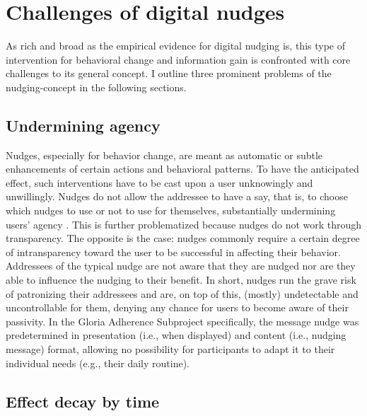 \documentclass[reflection, authordate]{jote-new-article}
\begin{document}
\section{Challenges of digital nudges}



As rich and broad as the empirical evidence for digital nudging is, this type of intervention for behavioral change and information gain is confronted with core challenges to its general concept. I outline three prominent problems of the nudging-concept in the following sections.



\subsection{Undermining agency}



Nudges, especially for behavior change, are meant as automatic or subtle enhancements of certain actions and behavioral patterns. To have the anticipated effect, such interventions have to be cast upon a user unknowingly and unwillingly. Nudges do not allow the addressee to have a say, that is, to choose which nudges to use or not to use for themselves, substantially undermining users’ agency \parencites[for an extensive discussion][]{Hertwig2020}. This is further problematized because nudges do not work through transparency. The opposite is the case: nudges commonly require a certain degree of intransparency toward the user to be successful in affecting their behavior. Addressees of the typical nudge are not aware that they are nudged nor are they able to influence the nudging to their benefit. In short, nudges run the grave risk of patronizing their addressees and are, on top of this, (mostly) undetectable and uncontrollable for them, denying any chance for users to become aware of their passivity. In the Gloria Adherence Subproject specifically, the message nudge was predetermined in presentation (i.e., when displayed) and content (i.e., nudging message) format, allowing no possibility for participants to adapt it to their individual needs (e.g., their daily routine).



\subsection{Effect decay by time}
\end{document}
